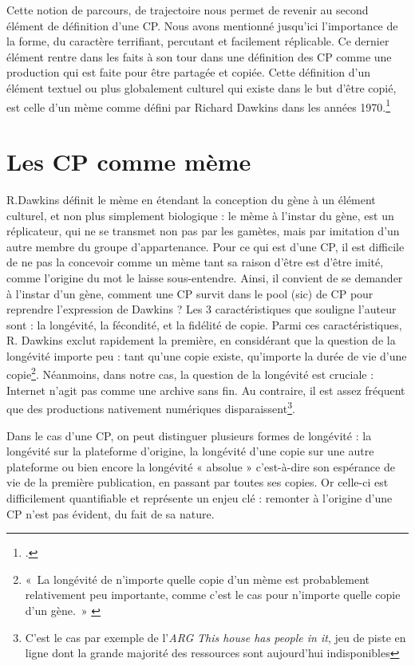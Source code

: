 \documentclass[12pt,a4paper,oneside,titlepage]{book} %
\begin{document}
	Cette notion de parcours, de trajectoire nous permet de revenir au second élément de définition d’une CP. Nous avons mentionné jusqu’ici l’importance de la forme, du caractère terrifiant, percutant et facilement réplicable. Ce dernier élément rentre dans les faits à son tour dans une définition des CP comme une production qui est faite pour être partagée et copiée. Cette définition d’un élément textuel ou plus globalement culturel qui existe dans le but d’être copié, est celle d’un mème comme défini par Richard Dawkins dans les années 1970.\footcite{dawkins_selfish_1989}
	
	\section{Les CP comme mème}
	R.Dawkins définit le mème en étendant la conception du gène à un élément culturel, et non plus simplement biologique : le mème à l’instar du gène, est un réplicateur, qui ne se transmet non pas par les gamètes, mais par imitation d’un autre membre du groupe d’appartenance. Pour ce qui est d’une CP, il est difficile de ne pas la concevoir comme un mème tant sa raison d’être est d’être imité, comme l’origine du mot le laisse sous-entendre. 
	Ainsi, il convient de se demander à l’instar d’un gène, comment une CP survit dans le \og pool \fg{}(sic) de CP pour reprendre l’expression de Dawkins ? 
	Les 3 caractéristiques que souligne l’auteur sont : la longévité, la fécondité, et la fidélité de copie. Parmi ces caractéristiques, R. Dawkins exclut rapidement la première, en considérant que la question de la longévité importe peu : tant qu’une copie existe, qu’importe la durée de vie d’une copie\footnote{« La longévité de n’importe quelle copie d’un mème est probablement relativement peu importante, comme c’est le cas pour n’importe quelle copie d’un gène. » \cite[voir p.218]{dawkins_selfish_1989}}. Néanmoins, dans notre cas, la question de la longévité est cruciale : Internet n’agit pas comme une archive sans fin. Au contraire, il est assez fréquent que des productions nativement numériques disparaissent\footnote{C'est le cas par exemple de l'\emph{ARG} \emph{This house has people in it}, jeu de piste en ligne dont la grande majorité des ressources sont aujourd'hui indisponibles}. 
	
	Dans le cas d’une CP, on peut distinguer plusieurs formes de longévité : la longévité sur la plateforme d’origine, la longévité d’une copie sur une autre plateforme ou bien encore la longévité « absolue » c’est-à-dire son espérance de vie de la première publication, en passant par toutes ses copies. Or celle-ci est difficilement quantifiable et représente un enjeu clé : remonter à l’origine d’une CP n’est pas évident, du fait de sa nature.
\end{document}
